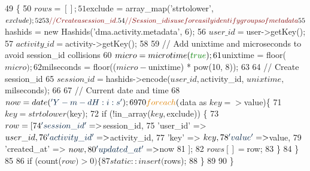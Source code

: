 \begin{DoxyCode}
49     \{
50         $rows = [];
51         $exclude = array\_map(\textcolor{stringliteral}{'strtolower'}, $exclude);
52         
53         \textcolor{comment}{// Create a session\_id.}
54         \textcolor{comment}{// Session\_id is use for easily identify groups of metadata }
55         $hashids = \textcolor{keyword}{new} Hashids(\textcolor{stringliteral}{'dma.activity.metadata'}, 6);
56         $user\_id        = $user->getKey();
57         $activity\_id    = $activity->getKey();
58         
59         \textcolor{comment}{// Add unixtime and microseconds to avoid session\_id collisions }
60         $micro       = microtime(\textcolor{keyword}{true});
61         $unixtime    = floor($micro);
62         $milseconds  = floor(($micro - $unixtime) * pow(10, 8)); 
63         
64         \textcolor{comment}{// Create session\_id}
65         $session\_id     = $hashids->encode($user\_id, $activity\_id, $unixtime, $milseconds);
66         
67         \textcolor{comment}{// Current date and time}
68         $now            = date(\textcolor{stringliteral}{'Y-m-d H:i:s'});
69         
70         \textcolor{keywordflow}{foreach}($data as $key => $value)\{
71             $key = strtolower($key);
72             \textcolor{keywordflow}{if} (!in\_array($key, $exclude)) \{
73                 $row = [
74                     \textcolor{stringliteral}{'session\_id'}    =>  $session\_id,
75                     \textcolor{stringliteral}{'user\_id'}       =>  $user\_id,
76                     \textcolor{stringliteral}{'activity\_id'}   =>  $activity\_id,
77                     \textcolor{stringliteral}{'key'}           =>  $key,
78                     \textcolor{stringliteral}{'value'}         =>  $value,
79                     \textcolor{stringliteral}{'created\_at'}    =>  $now,
80                     \textcolor{stringliteral}{'updated\_at'}    =>  $now
81                 ];
82                 $rows[] = $row;
83             \}
84         \}
85 
86         \textcolor{keywordflow}{if} (count($row) > 0)\{
87             static::insert($rows);
88         \}
89         
90     \}
\end{DoxyCode}
